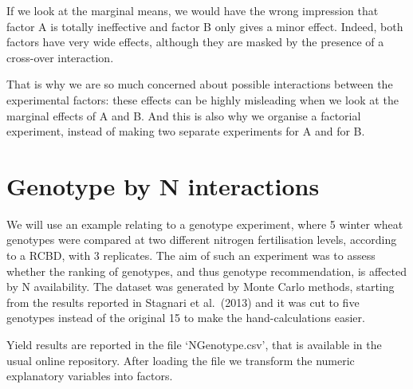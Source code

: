 \documentclass[a4paper,12pt,oneside]{book}
\begin{document}
If we look at the marginal means, we would have the wrong impression that factor A is totally ineffective and factor B only gives a minor effect. Indeed, both factors have very wide effects, although they are masked by the presence of a cross-over interaction.

That is why we are so much concerned about possible interactions between the experimental factors: these effects can be highly misleading when we look at the marginal effects of A and B. And this is also why we organise a factorial experiment, instead of making two separate experiments for A and for B.

\hypertarget{genotype-by-n-interactions}{%
\section{Genotype by N interactions}\label{genotype-by-n-interactions}}

We will use an example relating to a genotype experiment, where 5 winter wheat genotypes were compared at two different nitrogen fertilisation levels, according to a RCBD, with 3 replicates. The aim of such an experiment was to assess whether the ranking of genotypes, and thus genotype recommendation, is affected by N availability. The dataset was generated by Monte Carlo methods, starting from the results reported in Stagnari et al.~(2013) and it was cut to five genotypes instead of the original 15 to make the hand-calculations easier.

Yield results are reported in the file `NGenotype.csv', that is available in the usual online repository. After loading the file we transform the numeric explanatory variables into factors.

\vspace{12pt}
\end{document}
